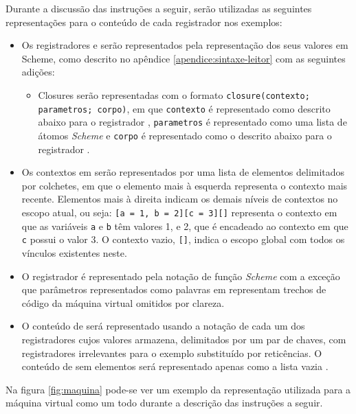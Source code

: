 Durante a discussão das instruções a seguir, serão utilizadas as seguintes
representações para o conteúdo de cada registrador nos exemplos:

\begin{itemize}

\item Os registradores  e  serão representados
pela representação dos seus valores em Scheme, como descrito no apêndice 
\ref{apendice:sintaxe-leitor} com as seguintes adições:
 \begin{itemize}
 
 \item Closures serão representadas com o formato \texttt{closure(contexto;
parametros; corpo)}, em que \texttt{contexto} é representado como descrito
abaixo para o registrador , \texttt{parametros} é
representado como uma lista de átomos \textit{Scheme} e \texttt{corpo} é
representado como o descrito abaixo para o registrador .

 \end{itemize}
\item Os contextos em  serão representados por uma lista de
elementos delimitados por colchetes, em que o elemento mais à esquerda
representa o contexto mais recente. Elementos mais à direita indicam os demais
níveis de contextos no escopo atual, ou seja: \texttt{[a = 1, b = 2][c = 3][]}
representa o contexto em que as variáveis \texttt{a} e \texttt{b} têm valores
1, e 2, que é encadeado ao contexto em que \texttt{c} possui o valor 3. O
contexto vazio, \texttt{[]}, indica o escopo global com todos os vínculos
existentes neste.

\item O registrador  é representado pela notação de função
\textit{Scheme} com a exceção que parâmetros representados como palavras em
 representam trechos de código da máquina virtual omitidos por
clareza.

\item O conteúdo de  será representado usando a notação de cada um
dos registradores cujos valores armazena, delimitados por um par de chaves, com
registradores irrelevantes para o exemplo substituído por reticências. O
conteúdo de  sem elementos será representado apenas como a lista
vazia \sctt{()}.

\end{itemize} 

Na figura \ref{fig:maquina} pode-se ver um exemplo da representação utilizada
para a máquina virtual como um todo durante a descrição das instruções a
seguir.

